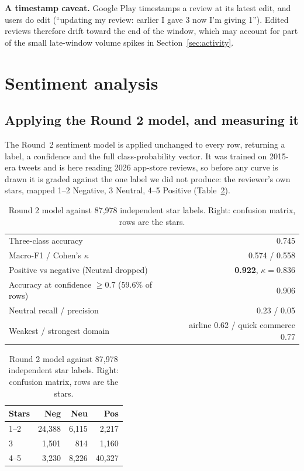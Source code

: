 \documentclass[11pt,a4paper]{article}
\begin{document}
\textbf{A timestamp caveat.} Google Play timestamps a review at its latest edit, and users do edit (``updating my review: earlier I gave 3 now I'm giving 1''). Edited reviews therefore drift toward the end of the window, which may account for part of the small late-window volume spikes in Section~\ref{sec:activity}.

\section{Sentiment analysis}\label{sec:sentiment}

\subsection{Applying the Round 2 model, and measuring it}

The Round~2 sentiment model is applied unchanged to every row, returning a label, a confidence and the full class-probability vector. It was trained on 2015-era tweets and is here reading 2026 app-store reviews, so before any curve is drawn it is graded against the one label we did not produce: the reviewer's own stars, mapped 1--2 Negative, 3 Neutral, 4--5 Positive (Table~\ref{tab:transfer}).

\begin{table}[htbp]\centering\small
\caption{Round 2 model against 87,978 independent star labels. Right: confusion matrix, rows are the stars.}\label{tab:transfer}
\begin{minipage}[t]{0.53\linewidth}\centering
\begin{tabular}{@{}lr@{}}
\toprule
Three-class accuracy & 0.745\\
Macro-F1 / Cohen's $\kappa$ & 0.574 / 0.558\\
Positive vs negative (Neutral dropped) & \textbf{0.922}, $\kappa=0.836$\\
Accuracy at confidence $\geq0.7$ (59.6\% of rows) & 0.906\\
Neutral recall / precision & 0.23 / 0.05\\
Weakest / strongest domain & airline 0.62 / quick commerce 0.77\\
\bottomrule
\end{tabular}
\end{minipage}\hfill
\begin{minipage}[t]{0.43\linewidth}\centering
\begin{tabular}{@{}lrrr@{}}
\toprule
Stars & Neg & Neu & Pos\\
\midrule
1--2 & 24,388 & 6,115 & 2,217\\
3 & 1,501 & 814 & 1,160\\
4--5 & 3,230 & 8,226 & 40,327\\
\bottomrule
\end{tabular}
\end{minipage}
\end{table}
\end{document}
